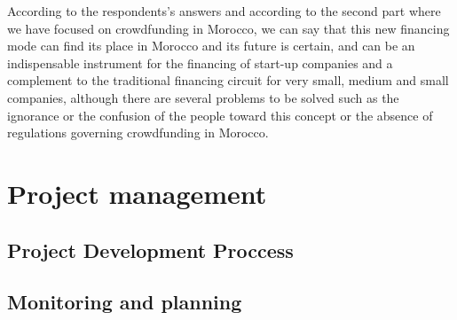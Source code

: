 According  to  the  respondents's answers  and  according  to  the  second  part  where  we  have  focused  on  crowdfunding  in Morocco,  we  can  say  that  this  new  financing  mode  can  find  its  place  in  Morocco  and  its  future  is  certain,  and  can  be  an indispensable instrument for the financing of start-up companies and a complement to the traditional financing circuit for very small, medium and small companies, although there are several problems to be solved such as the ignorance or the confusion of the people toward this concept or the absence of regulations governing crowdfunding in Morocco.

\section*{ Project management }
\subsection*{ Project Development Proccess }
\subsection*{ Monitoring and planning }